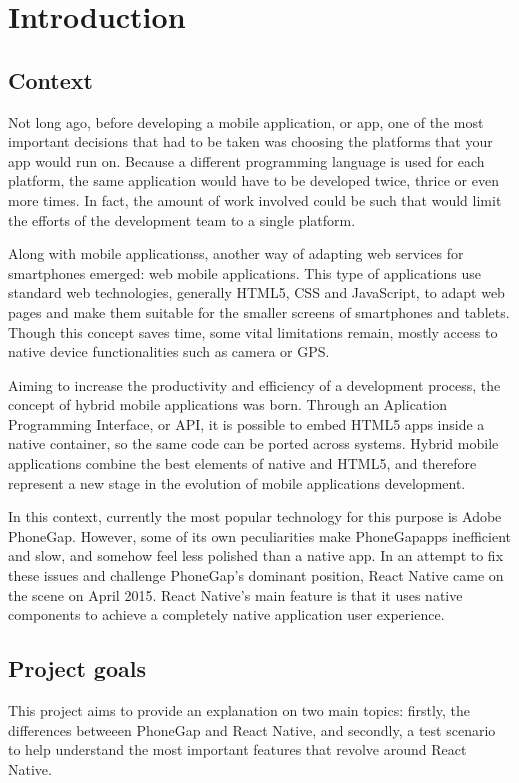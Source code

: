 \chapter{Introduction}
\justifying
\section{Context}
Not long ago, before developing a mobile application, or app, one of the most important decisions that had to be taken was choosing the platforms that your app would run on. Because a different programming language is used for each platform, the same application would have to be developed twice, thrice or even more times. In fact, the amount of work involved could be such that would limit the efforts of the development team to a single platform.

Along with mobile applicationss, another way of adapting web services for smartphones emerged: web mobile applications. This type of applications use standard web technologies, generally HTML5, CSS and JavaScript, to adapt web pages and make them suitable for the smaller screens of smartphones and tablets. Though this concept saves time, some vital limitations remain, mostly access to native device functionalities such as camera or GPS.

Aiming to increase the productivity and efficiency of a development process, the concept of hybrid mobile applications was born. Through an Aplication Programming Interface, or API, it is possible to embed HTML5 apps inside a native container, so the same code can be ported across systems. Hybrid mobile applications combine the best elements of native and HTML5, and therefore represent a new stage in the evolution of mobile applications development.

In this context, currently the most popular technology for this purpose is Adobe PhoneGap. However, some of its own peculiarities make PhoneGapapps inefficient and slow, and somehow feel less polished  than a native app. In an attempt to fix these issues and challenge PhoneGap's dominant position, React Native came on the scene on April 2015. React Native's main feature is that it uses native components to achieve a completely native application user experience.

\section{Project goals}

This project aims to provide an explanation on two main topics: firstly, the differences betweeen  PhoneGap and React Native, and secondly, a test scenario to help understand the most important features that revolve around React Native.

